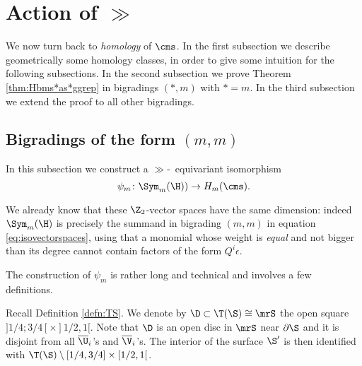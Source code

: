 \section{Action of $\gg$}
\label{sec:Actiongg}
We now turn back to \emph{homology} of $\cms$. In the first subsection we describe geometrically some
homology classes, in order to give some intuition for the following subsections.
In the second subsection we prove Theorem
\ref{thm:Hbms*as*ggrep} in bigradings $(*,m)$ with $*=m$.
In the third subsection we extend the proof to all other bigradings.



\subsection{Bigradings of the form $(m,m)$}
In this subsection we construct a $\gg$-~equivariant isomorphism 
\[
\psi_m\colon \Sym_m(\H))\to H_m(\cms).
\]

We already know that these $\Z_2$-vector spaces have the same dimension:
indeed $\Sym_m(\H)$ is precisely the summand in bigrading $(m,m)$ in equation
\eqref{eq:isovectorspaces}, using that a monomial
 whose
weight is \emph{equal} and not bigger than its degree cannot contain factors of the form
$Q^i\epsilon$.

The construction of $\psi_m$ is rather long and technical and involves a few definitions.

\begin{defn}
\label{defn:DinTS} 
Recall Definition \ref{defn:TS}. We denote by $\D\subset\T(\S)\cong\mrS$ the open square $]1/4;3/4[\times]1/2,1[$.
Note that $\D$ is an open disc in $\mrS$ near $\partial\S$ and 
it is disjoint from all $\overline{\U}_i$'s and $\overline{\V}_i$'s. The interior of the surface $\S'$
is then identified with $\T(\S)\setminus [1/4,3/4]\times[1/2,1[$.
\end{defn}


